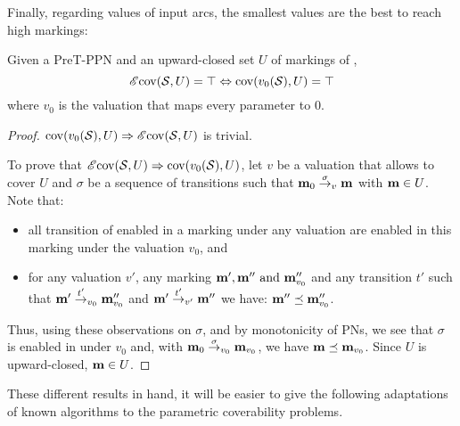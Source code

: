 Finally, regarding values of input arcs, the smallest values are the best to reach high markings:

\begin{theo}
  \label{theo:pre-e-zero-val}
  Given a PreT-\ac{PPN} \SPTPm and an upward-closed set $U$ of markings of \PPN, \[\operatorname{\mathscr{E}cov}(\mathcal{S}, U) = \top \Leftrightarrow \operatorname{cov}(v_0(\mathcal{S}), U) = \top\] where $v_0$ is the valuation that maps every parameter to $0$.
\end{theo}

\begin{proof}
  $\operatorname{cov}(v_0(\mathcal{S}), U) \Rightarrow \operatorname{\mathscr{E}cov}(\mathcal{S}, U)$ is trivial.

  To prove that $\operatorname{\mathscr{E}cov}(\mathcal{S}, U) \Rightarrow \operatorname{cov}(v_0(\mathcal{S}), U)$, let $v$ be a valuation that allows to cover $U$ and $\sigma$ be a sequence of transitions such that $\mathbf{m}_0 \stackrel{\sigma}{\to}_v \mathbf{m}$ with $\mathbf{m} \in U$.
  Note that:
  \begin{itemize}
    \item all transition of \PPN enabled in a marking under any valuation are enabled in this marking under the valuation $v_0$, and
    \item for any valuation $v'$, any marking $\mathbf{m}', \mathbf{m}'' \text{ and } \mathbf{m}''_{v_0}$ and any transition $t'$ such that $\mathbf{m}' \stackrel{t'}{\to}_{v_0} \mathbf{m}''_{v_0}$ and $\mathbf{m}' \stackrel{t'}{\to}_{v'} \mathbf{m}''$ we have: $\mathbf{m}'' \preceq \mathbf{m}''_{v_0}$.
  \end{itemize}

  Thus, using these observations on $\sigma$, and by monotonicity of \acp{PN}, we see that $\sigma$ is enabled in \mari under $v_0$ and, with $\mathbf{m}_0 \stackrel{\sigma}{\to}_{v_0} \mathbf{m}_{v_0}$, we have $\mathbf{m} \preceq \mathbf{m}_{v_0}$.
  Since $U$ is upward-closed, $\mathbf{m} \in U$.
\end{proof}

These different results in hand, it will be easier to give the following adaptations of known algorithms to the parametric coverability problems.
